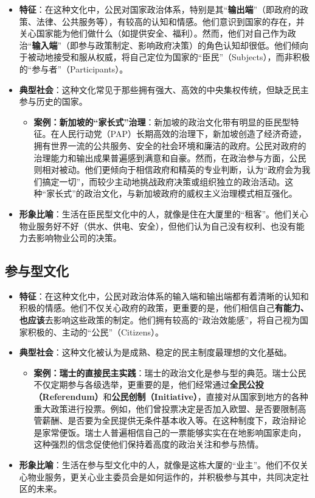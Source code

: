\begin{itemize}
    \item \textbf{特征}：在这种文化中，公民对国家政治体系，特别是其“\textbf{输出端}”（即政府的政策、法律、公共服务等），有较高的认知和情感。他们意识到国家的存在，并关心国家能为他们做什么（如提供安全、福利）。然而，他们对自己作为政治“\textbf{输入端}”（即参与政策制定、影响政府决策）的角色认知却很低。他们倾向于被动地接受和服从权威，将自己定位为国家的“臣民”（Subjects），而非积极的“参与者”（Participants）。
    \item \textbf{典型社会}：这种文化常见于那些拥有强大、高效的中央集权传统，但缺乏民主参与历史的国家。
    \begin{itemize}
        \item \textbf{案例：新加坡的“家长式”治理}：新加坡的政治文化带有明显的臣民型特征。在人民行动党（PAP）长期高效的治理下，新加坡创造了经济奇迹，拥有世界一流的公共服务、安全的社会环境和廉洁的政府。公民对政府的治理能力和输出成果普遍感到满意和自豪。然而，在政治参与方面，公民则相对被动。他们更倾向于相信政府和精英的专业判断，认为“政府会为我们搞定一切”，而较少主动地挑战政府决策或组织独立的政治活动。这种“家长式”的政治文化，与新加坡政府的威权主义治理模式相互强化。
    \end{itemize}
    \item \textbf{形象比喻}：生活在臣民型文化中的人，就像是住在大厦里的“租客”。他们关心物业服务好不好（供水、供电、安全），但他们认为自己没有权利、也没有能力去影响物业公司的决策。
\end{itemize}

\subsection{参与型文化}

\begin{itemize}
    \item \textbf{特征}：在这种文化中，公民对政治体系的输入端和输出端都有着清晰的认知和积极的情感。他们不仅关心政府的政策，更重要的是，他们相信自己\textbf{有能力、也应该}去影响这些政策的制定。他们拥有较高的“政治效能感”，将自己视为国家积极的、主动的“公民”（Citizens）。
    \item \textbf{典型社会}：这种文化被认为是成熟、稳定的民主制度最理想的文化基础。
    \begin{itemize}
        \item \textbf{案例：瑞士的直接民主实践}：瑞士的政治文化是参与型的典范。瑞士公民不仅定期参与各级选举，更重要的是，他们经常通过\textbf{全民公投（Referendum）}和\textbf{公民创制（Initiative）}，直接对从国家到地方的各种重大政策进行投票。例如，他们曾投票决定是否加入欧盟、是否要限制高管薪酬、是否要为全民提供无条件基本收入等。在这种制度下，政治辩论是家常便饭。瑞士人普遍相信自己的一票能够实实在在地影响国家走向，这种强烈的信念促使他们保持着高度的政治关注和参与热情。
    \end{itemize}
    \item \textbf{形象比喻}：生活在参与型文化中的人，就像是这栋大厦的“业主”。他们不仅关心物业服务，更关心业主委员会是如何运作的，并积极参与其中，共同决定社区的未来。
\end{itemize}

